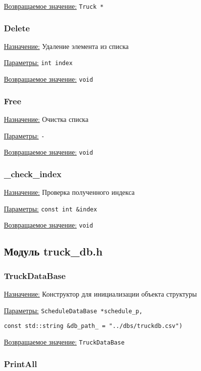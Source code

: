 \underline{Возвращаемое значение:} \verb|Truck *|


\subsubsection*{Delete}

\underline{Назначение:} Удаление элемента из списка

\underline{Параметры:} \verb|int index|

\underline{Возвращаемое значение:} \verb|void|


\subsubsection*{Free}

\underline{Назначение:} Очистка списка

\underline{Параметры:} \verb|-|

\underline{Возвращаемое значение:} \verb|void|


\subsubsection*{\_check\_index}

\underline{Назначение:} Проверка полученного индекса

\underline{Параметры:} \verb|const int &index|

\underline{Возвращаемое значение:} \verb|void|


\subsection*{Модуль truck\_db.h}

\subsubsection*{TruckDataBase}

\underline{Назначение:} Конструктор для инициализации объекта структуры

\underline{Параметры:} \verb|ScheduleDataBase *schedule_p,|

\verb|const std::string &db_path_ = "../dbs/truckdb.csv")|

\underline{Возвращаемое значение:} \verb|TruckDataBase|


\subsubsection*{PrintAll}

